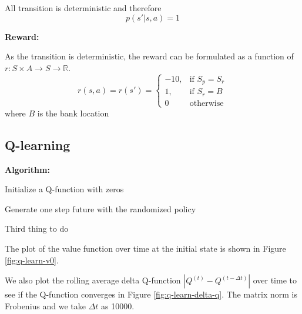 \documentclass{article}
\begin{document}
All transition is deterministic and therefore
\begin{equation*}
  p(s' | s, a) = 1
\end{equation*}

\textbf{Reward:}

As the transition is deterministic,
the reward can be formulated as a function of $r: S\times A \rightarrow S \rightarrow \mathbb{R}$.
\begin{equation*}
  r(s, a) = r(s') =
\begin{cases}
    -10 ,& \text{if } S_p = S_r\\
    1,   & \text{if } S_r = B\\
    0    & \text{otherwise}
\end{cases}
\end{equation*}
where $B$ is the bank location

\subsection{Q-learning}

\textbf{Algorithm:}
\begin{steps}
  \item Initialize a Q-function with zeros
  \item Generate one step future with the randomized policy
  \item Third thing to do
\end{steps}

The plot of the value function over time at the initial state is shown in Figure
\ref{fig:q-learn-v0}.

We also plot the rolling average delta Q-function $|Q^{(t)} - Q^{(t-\Delta t)}|$ over time
to see if the Q-function converges in Figure \ref{fig:q-learn-delta-q}.
The matrix norm is Frobenius and
we take $\Delta t$ as 10000.
\end{document}
